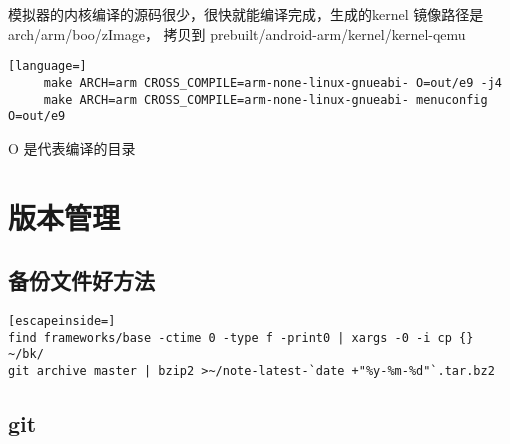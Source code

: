 \documentclass[a4paper,titlepage]{article}
\begin{document}
模拟器的内核编译的源码很少，很快就能编译完成，生成的kernel 镜像路径是
 arch/arm/boo/zImage， 拷贝到  prebuilt/android-arm/kernel/kernel-qemu  
 \begin{lstlisting}[language=] 
     make ARCH=arm CROSS_COMPILE=arm-none-linux-gnueabi- O=out/e9 -j4
     make ARCH=arm CROSS_COMPILE=arm-none-linux-gnueabi- menuconfig O=out/e9
 \end{lstlisting}
O 是代表编译的目录

\section{版本管理}

\subsection{备份文件好方法}
\begin{lstlisting}[escapeinside=]
find frameworks/base -ctime 0 -type f -print0 | xargs -0 -i cp {} ~/bk/
git archive master | bzip2 >~/note-latest-`date +"%y-%m-%d"`.tar.bz2
\end{lstlisting}

\subsection{git}
\end{document}
